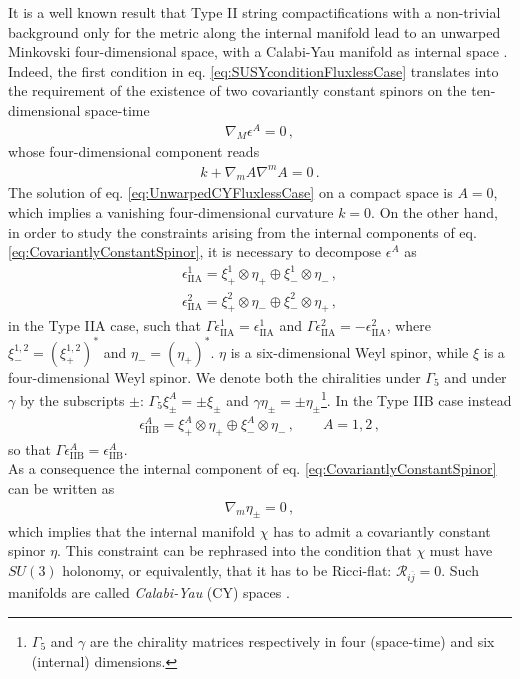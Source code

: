 \documentclass[12pt,a4paper]{book}
\begin{document}
It is a well known result that Type II string compactifications with a non-trivial background only for the metric along the internal manifold lead to an unwarped Minkovski four-dimensional space, with a Calabi-Yau manifold as internal space \cite{Candelas:1985en}. Indeed, the first condition in eq. \eqref{eq:SUSYconditionFluxlessCase} translates into the requirement of the existence of two covariantly constant spinors on the ten-dimensional space-time
\begin{align}
\label{eq:CovariantlyConstantSpinor}	
\nabla_M \epsilon^A = 0 \,,
\end{align}
whose four-dimensional component reads
\begin{align}
\label{eq:UnwarpedCYFluxlessCase}
k + \nabla_m A \nabla^m A = 0\,.
\end{align}
The solution of eq. \eqref{eq:UnwarpedCYFluxlessCase} on a compact space is $A = 0$, which implies a vanishing four-dimensional curvature $k = 0$. On the other hand, in order to study the constraints arising from the internal components of eq. \eqref{eq:CovariantlyConstantSpinor}, it is necessary to decompose $\epsilon^A$ as
\begin{align}
\label{eq:SpinorDecompositionBareIIA}
\epsilon^1_{\text{IIA}} = \xi^1_+ \otimes \eta_+ \oplus \xi^1_- \otimes \eta_- \,, \nonumber \\
\epsilon^2_{\text{IIA}} = \xi^2_+ \otimes \eta_- \oplus \xi^2_- \otimes \eta_+\,,
\end{align}
in the Type IIA case, such that $\Gamma \epsilon^1_{\text{IIA}} = \epsilon^1_{\text{IIA}}$ and $\Gamma \epsilon^2_{\text{IIA}} =- \epsilon^2_{\text{IIA}}$, where $\xi^{1,2}_- = \left(\xi^{1,2}_+\right)^*$ and $\eta_- = \left(\eta_+\right)^*$. $\eta$ is a six-dimensional Weyl spinor, while $\xi$ is a four-dimensional Weyl spinor. We denote both the chiralities under $\Gamma_5$ and under $\gamma$ by the subscripts $\pm$: $\Gamma_5 \xi^A_\pm = \pm \xi_\pm$ and $\gamma \eta_\pm = \pm \eta_\pm$\footnote{$\Gamma_5$ and $\gamma$ are the chirality matrices respectively in four (space-time) and six (internal) dimensions.}. In the Type IIB case instead
\begin{align}
\label{eq:SpinorDecompositionBareIIB}
\epsilon^A_{\text{IIB}} = \xi^A_+ \otimes \eta_+ \oplus \xi^A_- \otimes \eta_-\,, \qquad A= 1,2\,,
\end{align}
so that $\Gamma \epsilon^A_{\text{IIB}} = \epsilon^A_{\text{IIB}}$.\\

As a consequence the internal component of eq. \eqref{eq:CovariantlyConstantSpinor} can be written as
\begin{align}
\label{eq:CYCondition}
\nabla_m \eta_\pm = 0 \,,
\end{align}
which implies that the internal manifold $\chi$ has to admit a covariantly constant spinor $\eta$. This constraint can be rephrased into the condition that $\chi$ must have $SU(3)$ holonomy, or equivalently, that it has to be Ricci-flat: $\mathcal{R}_{i \overline{j}} = 0$. Such manifolds are called \textit{Calabi-Yau} (CY) spaces \cite{Candelas:1985en}.\\
\end{document}
